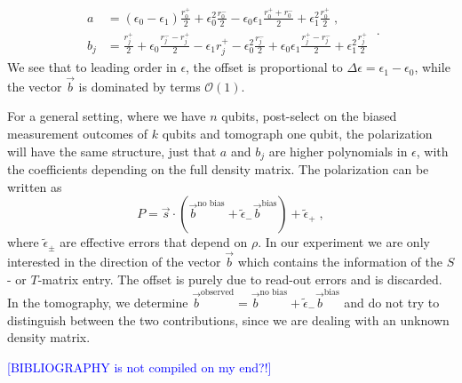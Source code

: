 \documentclass[two column]{article}
\newcommand{\jovan}[1]{\textcolor{blue}{[#1]}}
\begin{document}
\begin{equation}
\begin{aligned}
	a&=(\epsilon_0-\epsilon_1) \frac{r^+_0}{2} +\epsilon_0^2 \frac{r^-_0}{2} -\epsilon_0 \epsilon_1 \frac{r^+_0+r^-_0}{2} +\epsilon_1^2 \frac{r_0^+}{2}\;,\\
	b_j&=\frac{r^+_j}{2}+ \epsilon_0 \frac{r^-_j-r^+_j}{2} -\epsilon_1 r^+_j -\epsilon_0^2 \frac{r^-_j}{2} +\epsilon_0 \epsilon_1 \frac{r^+_j-r^-_j}{2} + \epsilon_1^2 \frac{r_j^+}{2}
	\end{aligned}\;.
\end{equation}
We see that to leading order in $\epsilon$, the offset is proportional to $\Delta \epsilon=\epsilon_1-\epsilon_0$, while the vector $\vec b$ is dominated by terms $\mathcal O(1)$.

For a general setting, where we have $n$ qubits, post-select on the biased measurement outcomes of $k$ qubits and tomograph one qubit, the polarization will have the same structure, just that $a$ and $b_j$ are higher polynomials in $\epsilon$, with the coefficients depending on the full density matrix. The polarization can be written as 
\begin{equation}
	P=\vec s \cdot (\vec b^\text{no bias} + \tilde{\epsilon}_- \vec b^\text{bias}) + \tilde \epsilon_+ \;,
\end{equation}
where $\tilde \epsilon_\pm$ are effective errors that depend on $\rho$. In our experiment we are only interested in the direction of the vector $\vec b$ which contains the information of the $S$- or $T$-matrix entry. The offset is purely due to read-out errors and is discarded. In the tomography, we determine $\vec b^\text{observed}=\vec b^\text{no bias} + \tilde{\epsilon}_- \vec b^\text{bias}$ and do not try to distinguish between the two contributions, since we are dealing with an unknown density matrix.


\jovan{BIBLIOGRAPHY is not compiled on my end?!}

%




%

\end{document}
